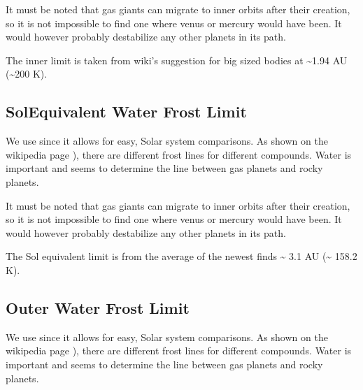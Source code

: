 \documentclass[letterpaper,10pt,english]{sphinxmanual}
\begin{document}
\sphinxAtStartPar
It must be noted that gas giants can migrate to inner orbits after their creation,
so it is not impossible to find one where venus or mercury would have been. It would however
probably destabilize any other planets in its path.

\sphinxAtStartPar
The inner limit is taken from wiki’s suggestion for big sized bodies at \textasciitilde{}1.94 AU (\textasciitilde{}200 K).


\subsection{Sol\sphinxhyphen{}Equivalent Water Frost Limit}
\label{\detokenize{quantities/children_orbit_limits/sol_equivalent_water_frost_limit:sol-equivalent-water-frost-limit}}\label{\detokenize{quantities/children_orbit_limits/sol_equivalent_water_frost_limit::doc}}\label{\detokenize{quantities/children_orbit_limits/sol_equivalent_water_frost_limit:id1}}
\sphinxAtStartPar
We use {\hyperref[\detokenize{quantities/insolation_models/selsis/selsis:selsis-insolation-model}]{}} since it allows for easy, Solar system comparisons.
As shown on the wikipedia page ), there are different
frost lines for different compounds. Water is important and seems to determine the line between gas planets and
rocky planets.

\sphinxAtStartPar
It must be noted that gas giants can migrate to inner orbits after their creation,
so it is not impossible to find one where venus or mercury would have been. It would however
probably destabilize any other planets in its path.

\sphinxAtStartPar
The Sol equivalent limit is from the average of the newest finds \textasciitilde{} 3.1 AU (\textasciitilde{} 158.2 K).


\subsection{Outer Water Frost Limit}
\label{\detokenize{quantities/children_orbit_limits/outer_water_frost_limit:outer-water-frost-limit}}\label{\detokenize{quantities/children_orbit_limits/outer_water_frost_limit::doc}}\label{\detokenize{quantities/children_orbit_limits/outer_water_frost_limit:id1}}
\sphinxAtStartPar
We use {\hyperref[\detokenize{quantities/insolation_models/selsis/selsis:selsis-insolation-model}]{}} since it allows for easy, Solar system comparisons.
As shown on the wikipedia page ), there are different
frost lines for different compounds. Water is important and seems to determine the line between gas planets and
rocky planets.
\end{document}
